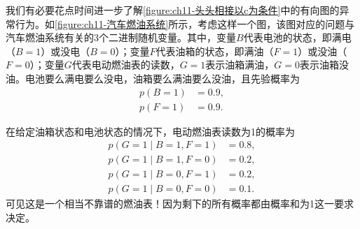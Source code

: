 \documentclass[../../main.tex]{subfiles}
\begin{document}
我们有必要花点时间进一步了解\cref{figure:ch11-头头相接以c为条件}中的有向图的异常行为。如\cref{figure:ch11-汽车燃油系统}所示，考虑这样一个图，该图对应的问题与汽车燃油系统有关的3个二进制随机变量。其中，变量$B$代表电池的状态，即满电（$B=1$）或没电（$B=0$）；变量$F$代表油箱的状态，即满油（$F=1$）或没油（$F=0$）；变量$G$代表电动燃油表的读数，$G=1$表示油箱满油，$G=0$表示油箱没油。电池要么满电要么没电，油箱要么满油要么没油，且先验概率为
\begin{align}
  p(B=1) &= 0.9,\\
  p(F=1) &= 0.9.
\end{align}

\begin{example}[ 汽车燃油系统]\label{example:ch11-汽车燃油系统}
在给定油箱状态和电池状态的情况下，电动燃油表读数为1的概率为
\begin{align}
  p(G=1\mid B=1,F=1) &= 0.8,\\
  p(G=1\mid B=1,F=0) &= 0.2,\\
  p(G=1\mid B=0,F=1) &= 0.2,\\
  p(G=1\mid B=0,F=0) &= 0.1.
\end{align}
可见这是一个相当不靠谱的燃油表！因为剩下的所有概率都由概率和为1这一要求决定。


\end{example}
\end{document}
